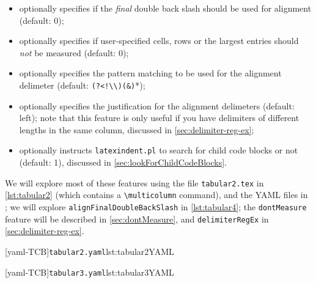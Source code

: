 \begin{itemize}
{		      alignment}\texttt{justification}: optionally specifies the justification of each cell as
		      either \emph{left} or \emph{right} (default: left);
		\item {}
		      optionally specifies if the \emph{final} double back slash should be used for alignment
		      (default: 0);
		\item {} optionally specifies if
		      user-specified cells, rows or the largest entries should \emph{not} be measured (default:
		      0);
		\item {} optionally specifies the
		      pattern matching to be used for the alignment delimeter (default:
		      \lstinline* '(?<!\\)(&)'*);
		\item {} optionally
		      specifies the justification for the alignment delimeters (default: left); note that this
		      feature is only useful if you have delimiters of different lengths in the same column,
		      discussed in \cref{sec:delimiter-reg-ex};
		\item {} optionally
		      instructs \texttt{latexindent.pl} to search for child code blocks or not (default: 1),
		      discussed in \cref{sec:lookForChildCodeBlocks}.
	\end{itemize}

	We will explore most of these features using the file \texttt{tabular2.tex} in
	\cref{lst:tabular2} (which contains a \lstinline!\multicolumn! command), and the YAML
	files in ; we will explore
	\texttt{alignFinalDoubleBackSlash} in \cref{lst:tabular4}; the \texttt{dontMeasure}
	feature will be described in \cref{sec:dontMeasure}, and \texttt{delimiterRegEx} in
	\cref{sec:delimiter-reg-ex}.

	\begin{minipage}{.45\textwidth}
		[yaml-TCB]{\texttt{tabular2.yaml}}{lst:tabular2YAML}
	\end{minipage}%
	\hfill
	\begin{minipage}{.48\textwidth}
		[yaml-TCB]{\texttt{tabular3.yaml}}{lst:tabular3YAML}
	\end{minipage}%

